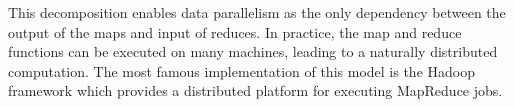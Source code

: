 
This decomposition enables data parallelism as the only dependency between the output of the maps and input of reduces. In 
practice, the map and reduce functions can be executed on many machines, leading to a naturally distributed computation. The most famous implementation
of this model is the Hadoop framework \cite{Hadoop:Website} which provides a distributed platform for executing MapReduce jobs. 


